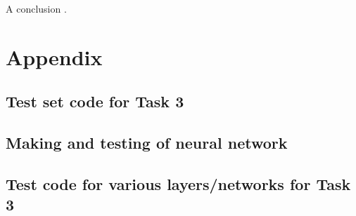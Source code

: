 \documentclass[a4paper, 10pt, conference]{ieeeconf}
\begin{document}
A conclusion \cite{pca}. 




\onecolumn
\section{Appendix} \label{sec:appendix}

\subsection*{Test set code for Task 3}

\newpage

\subsection*{Making and testing of neural network}

\newpage

\subsection*{Test code for various layers/networks for Task 3}

\newpage
\end{document}

